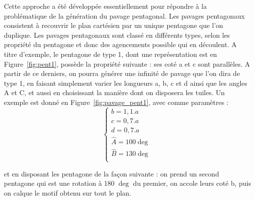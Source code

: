 \documentclass{article}
\begin{document}
\begin{enumerate}
\hspace*{0.5cm}Cette approche a été développée essentiellement pour répondre à la problématique de la génération du pavage pentagonal. Les pavages pentagonaux consistent à recouvrir le plan cartésien par un unique  pentagone que l'on duplique. Les pavages pentagonaux sont classé en différents types, selon les propriété du pentagone et donc des agencements possible qui en découlent. A titre d'exemple, le pentagone de type 1, dont une représentation est en Figure~\ref{fig:pent1}, possède la propriété suivante : ses coté a et c sont parallèles. A partir de ce derniers, on pourra générer une infinité de pavage que l'on dira de type 1, en faisant simplement varier les longueurs a, b, c et d ainsi que les angles A et C, et aussi en choisissant la manière dont on disposera les tuiles. Un exemple est donné en Figure~\ref{fig:pavage_pent1}, avec comme paramètres :
\begin{equation*}
    \left\{\begin{matrix}
                b = 1,1.a \\ 
                c = 0,7.a \\
                d = 0,7.a \\
                \hat{A} = 100 \deg \\
                \hat{B} = 130 \deg \\
\end{matrix}\right.
\end{equation*}

et en disposant les pentagone de la façon suivante : on prend un second pentagone qui est une rotation à 180 $\deg$ du premier, on accole leurs coté b, puis on calque le motif obtenu sur tout le plan.


\end{enumerate}
\end{document}
